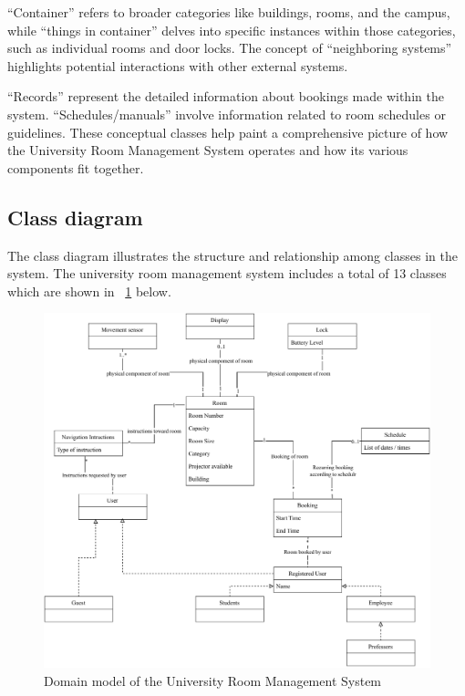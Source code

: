 \documentclass[conference,onecolumn]{IEEEtran}
\begin{document}
	``Container'' refers to broader categories like buildings, rooms, and the campus, while ``things in container'' delves into specific instances within those categories, such as individual rooms and door locks. The concept of ``neighboring systems'' highlights potential interactions with other external systems.
	
	``Records'' represent the detailed information about bookings made within the system. ``Schedules/manuals'' involve information related to room schedules or guidelines. These conceptual classes help paint a comprehensive picture of how the University Room Management System operates and how its various components fit together.

\subsection{Class diagram}
	The class diagram illustrates the structure and relationship among classes in the system. The university room management system includes a total of 13 classes which are shown in \figurename~\ref{fig:classdiagram} below.

	\begin{figure}[H]
		\centering
		\includegraphics[width=1\textwidth]{Figures/DomainModel.pdf}
		\caption{Domain model of the University Room Management System}
		\label{fig:classdiagram}
	\end{figure}
\end{document}
